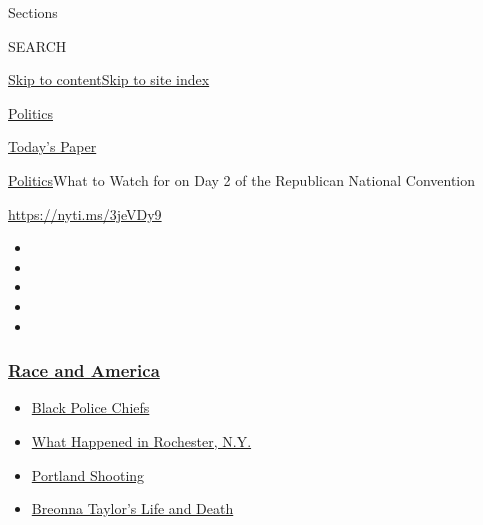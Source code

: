 Sections

SEARCH

\protect\hyperlink{site-content}{Skip to
content}\protect\hyperlink{site-index}{Skip to site index}

\href{https://www.nytimes3xbfgragh.onion/section/politics}{Politics}

\href{https://myaccount.nytimes3xbfgragh.onion/auth/login?response_type=cookie\&client_id=vi}{}

\href{https://www.nytimes3xbfgragh.onion/section/todayspaper}{Today's
Paper}

\href{/section/politics}{Politics}\textbar{}What to Watch for on Day 2
of the Republican National Convention

\url{https://nyti.ms/3jeVDy9}

\begin{itemize}
\item
\item
\item
\item
\item
\end{itemize}

\hypertarget{race-and-america}{%
\subsubsection{\texorpdfstring{\href{https://www.nytimes3xbfgragh.onion/news-event/george-floyd-protests-minneapolis-new-york-los-angeles?name=styln-george-floyd\&region=TOP_BANNER\&block=storyline_menu_recirc\&action=click\&pgtype=Article\&impression_id=a80c1340-f4d0-11ea-be14-1f129ac58728\&variant=undefined}{Race
and America}}{Race and America}}\label{race-and-america}}

\begin{itemize}
\tightlist
\item
  \href{https://www.nytimes3xbfgragh.onion/2020/09/11/us/black-police-chiefs-reform.html?name=styln-george-floyd\&region=TOP_BANNER\&block=storyline_menu_recirc\&action=click\&pgtype=Article\&impression_id=a80c1341-f4d0-11ea-be14-1f129ac58728\&variant=undefined}{Black
  Police Chiefs}
\item
  \href{https://www.nytimes3xbfgragh.onion/2020/09/04/nyregion/rochester-police-daniel-prude.html?name=styln-george-floyd\&region=TOP_BANNER\&block=storyline_menu_recirc\&action=click\&pgtype=Article\&impression_id=a80c1342-f4d0-11ea-be14-1f129ac58728\&variant=undefined}{What
  Happened in Rochester, N.Y.}
\item
  \href{https://www.nytimes3xbfgragh.onion/2020/08/30/us/portland-shooting-explained.html?name=styln-george-floyd\&region=TOP_BANNER\&block=storyline_menu_recirc\&action=click\&pgtype=Article\&impression_id=a80c1343-f4d0-11ea-be14-1f129ac58728\&variant=undefined}{Portland
  Shooting}
\item
  \href{https://www.nytimes3xbfgragh.onion/2020/08/30/us/breonna-taylor-police-killing.html?name=styln-george-floyd\&region=TOP_BANNER\&block=storyline_menu_recirc\&action=click\&pgtype=Article\&impression_id=a80c1344-f4d0-11ea-be14-1f129ac58728\&variant=undefined}{Breonna
  Taylor's Life and Death}
\end{itemize}

